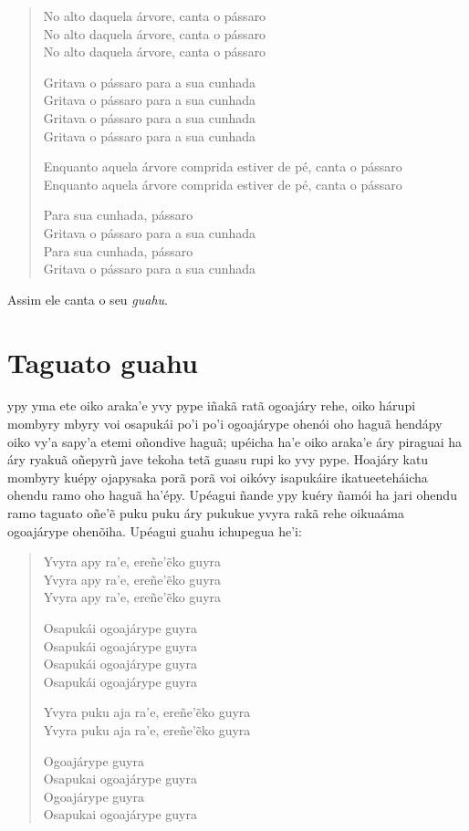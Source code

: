 \begin{verse}
No alto daquela árvore, canta o pássaro\\
No alto daquela árvore, canta o pássaro\\
No alto daquela árvore, canta o pássaro

Gritava o pássaro para a sua cunhada\\
Gritava o pássaro para a sua cunhada\\
Gritava o pássaro para a sua cunhada\\
Gritava o pássaro para a sua cunhada

Enquanto aquela árvore comprida estiver de pé, \qb{}canta o pássaro\\
Enquanto aquela árvore comprida estiver de pé, \qb{}canta o pássaro

Para sua cunhada, pássaro\\ \EP[1]
Gritava o pássaro para a sua cunhada\\
Para sua cunhada, pássaro\\
Gritava o pássaro para a sua cunhada
\end{verse}

Assim ele canta o seu \textit{guahu}.

\chapter{Taguato guahu}

 ypy yma ete oiko araka'e yvy pype iñakã ratã ogoajáry rehe, oiko
hárupi mombyry mbyry voi osapukái po'i po'i ogoajárype ohenói oho haguã
hendápy oiko vy'a sapy'a etemi oñondive haguã; upéicha ha'e oiko araka'e
áry piraguai ha áry ryakuã oñepyrũ jave tekoha tetã guasu rupi ko yvy
pype. Hoajáry katu mombyry kuépy ojapysaka porã porã voi oikóvy
isapukáire ikatueeteháicha ohendu ramo oho haguã ha'épy. Upéagui ñande
ypy kuéry ñamói ha jari ohendu ramo taguato oñe'ẽ puku puku áry pukukue
yvyra rakã rehe oikuaáma ogoajárype ohenõiha. Upéagui guahu ichupegua
he'i:

\begin{verse}
Yvyra apy ra'e, ereñe'ẽko guyra\\
Yvyra apy ra'e, ereñe'ẽko guyra\\
Yvyra apy ra'e, ereñe'ẽko guyra

Osapukái ogoajárype guyra\\
Osapukái ogoajárype guyra\\
Osapukái ogoajárype guyra\\
Osapukái ogoajárype guyra

Yvyra puku aja ra'e, ereñe'ẽko guyra\\
Yvyra puku aja ra'e, ereñe'ẽko guyra

Ogoajárype guyra\\
Osapukai ogoajárype guyra\\
Ogoajárype guyra\\
Osapukai ogoajárype guyra
\end{verse}

